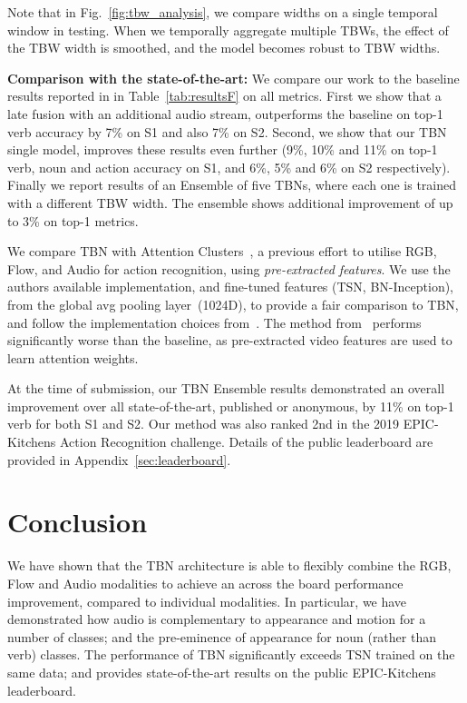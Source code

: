 \documentclass[10pt,twocolumn,letterpaper]{article}
\begin{document}
Note that in Fig.~\ref{fig:tbw_analysis}, we compare widths on a single temporal window in testing. When we temporally aggregate multiple TBWs, the effect of the TBW width is smoothed, and the model becomes robust to TBW widths. 

\noindent \textbf{Comparison with the state-of-the-art: }
We compare our work to the baseline results reported in \cite{Damen_2018_ECCV} in Table~\ref{tab:resultsF} on all metrics.
First we show that a late fusion with an additional audio stream, outperforms the baseline on top-1 verb accuracy by 7\% on S1 and also 7\% on S2. 
Second, we show that our TBN single model, improves these results even further (9\%, 10\% and 11\% on top-1 verb, noun and action accuracy on S1, and 6\%, 5\% and 6\% on S2 respectively). 
Finally we report results of an Ensemble of five TBNs, where each one is trained with a different TBW width. The ensemble shows additional improvement of up to 3\% on top-1 metrics.

We compare TBN with Attention Clusters~\cite{Long_2018_CVPR}, a previous effort to utilise RGB, Flow, and Audio for action recognition, using \textit{pre-extracted features}.
We use the authors available implementation, and fine-tuned features (TSN, BN-Inception), from the global avg pooling layer~(1024D), to
provide a fair comparison to TBN, and follow the implementation choices from~\cite{Long_2018_CVPR}.
The method from~\cite{Long_2018_CVPR} performs significantly worse than the baseline, as pre-extracted video features are used to learn attention weights. 

At the time of submission, our TBN Ensemble results demonstrated an overall improvement over all state-of-the-art, published or anonymous, by 11\% on top-1 verb for both S1 and S2. Our method was also ranked 2nd in the 2019 EPIC-Kitchens Action Recognition challenge. Details of the public leaderboard are provided in Appendix~\ref{sec:leaderboard}.


\section{Conclusion}
We have shown that the TBN architecture is able to flexibly combine the RGB, Flow and Audio modalities to achieve an across the board performance improvement, compared to individual modalities. In particular, we have demonstrated how audio is complementary to appearance and motion for a number of classes; and the pre-eminence of appearance for noun (rather than verb) classes.
The performance of TBN significantly exceeds TSN trained on the same data; and provides state-of-the-art results on the public EPIC-Kitchens leaderboard.
\end{document}

